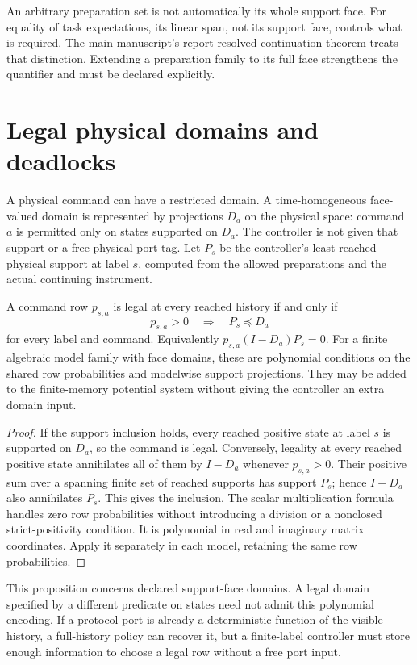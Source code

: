 An arbitrary preparation set is not automatically its whole support face. For equality of task expectations, its linear span, not its support face, controls what is required. The main manuscript's report-resolved continuation theorem treats that distinction. Extending a preparation family to its full face strengthens the quantifier and must be declared explicitly.

\section{Legal physical domains and deadlocks}
A physical command can have a restricted domain. A time-homogeneous face-valued domain is represented by projections $D_a$ on the physical space: command $a$ is permitted only on states supported on $D_a$. The controller is not given that support or a free physical-port tag. Let $P_s$ be the controller's least reached physical support at label $s$, computed from the allowed preparations and the actual continuing instrument.
\begin{proposition}\label{prop:legal}
A command row $p_{s,a}$ is legal at every reached history if and only if
\[
 p_{s,a}>0\quad\Longrightarrow\quad P_s\preccurlyeq D_a
\]
for every label and command. Equivalently $p_{s,a}(I-D_a)P_s=0$. For a finite algebraic model family with face domains, these are polynomial conditions on the shared row probabilities and modelwise support projections. They may be added to the finite-memory potential system without giving the controller an extra domain input.
\end{proposition}
\begin{proof}
If the support inclusion holds, every reached positive state at label $s$ is supported on $D_a$, so the command is legal. Conversely, legality at every reached positive state annihilates all of them by $I-D_a$ whenever $p_{s,a}>0$. Their positive sum over a spanning finite set of reached supports has support $P_s$; hence $I-D_a$ also annihilates $P_s$. This gives the inclusion. The scalar multiplication formula handles zero row probabilities without introducing a division or a nonclosed strict-positivity condition. It is polynomial in real and imaginary matrix coordinates. Apply it separately in each model, retaining the same row probabilities.
\end{proof}

This proposition concerns declared support-face domains. A legal domain specified by a different predicate on states need not admit this polynomial encoding. If a protocol port is already a deterministic function of the visible history, a full-history policy can recover it, but a finite-label controller must store enough information to choose a legal row without a free port input.

